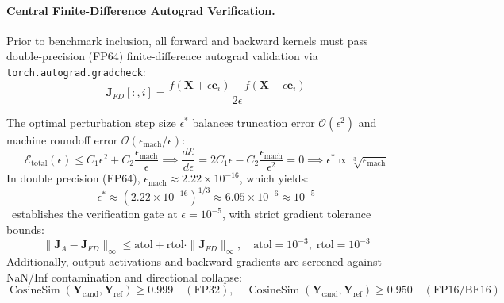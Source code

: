 \paragraph{Central Finite-Difference Autograd Verification.}
Prior to benchmark inclusion, all forward and backward kernels must pass double-precision (FP64) finite-difference autograd validation via \texttt{torch.autograd.gradcheck}:
\begin{equation}
\label{eq:finite_diff_eval}
\mathbf{J}_{FD}[:, i] = \frac{f(\mathbf{X} + \epsilon \mathbf{e}_i) - f(\mathbf{X} - \epsilon \mathbf{e}_i)}{2\epsilon}
\end{equation}

The optimal perturbation step size $\epsilon^*$ balances truncation error $\mathcal{O}(\epsilon^2)$ and machine roundoff error $\mathcal{O}(\epsilon_{\text{mach}} / \epsilon)$:
\begin{equation}
\label{eq:optimal_step_derivation}
\mathcal{E}_{\text{total}}(\epsilon) \le C_1 \epsilon^2 + C_2 \frac{\epsilon_{\text{mach}}}{\epsilon} \implies \frac{d\mathcal{E}}{d\epsilon} = 2 C_1 \epsilon - C_2 \frac{\epsilon_{\text{mach}}}{\epsilon^2} = 0 \implies \epsilon^* \propto \sqrt[3]{\epsilon_{\text{mach}}}
\end{equation}
In double precision (FP64), $\epsilon_{\text{mach}} \approx 2.22 \times 10^{-16}$, which yields:
\begin{equation}
\label{eq:eps_star_numeric}
\epsilon^* \approx \left(2.22 \times 10^{-16}\right)^{1/3} \approx 6.05 \times 10^{-6} \approx 10^{-5}
\end{equation}
\neuralops\ establishes the verification gate at $\epsilon = 10^{-5}$, with strict gradient tolerance bounds:
\begin{equation}
\label{eq:gradcheck_tolerances}
\|\mathbf{J}_A - \mathbf{J}_{FD}\|_\infty \le \text{atol} + \text{rtol} \cdot \|\mathbf{J}_{FD}\|_\infty, \quad \text{atol} = 10^{-3}, \; \text{rtol} = 10^{-3}
\end{equation}
Additionally, output activations and backward gradients are screened against NaN/Inf contamination and directional collapse:
\begin{equation}
\label{eq:sanity_check_formula}
\operatorname{CosineSim}(\mathbf{Y}_{\text{cand}}, \mathbf{Y}_{\text{ref}}) \ge 0.999 \quad (\text{FP32}), \quad \operatorname{CosineSim}(\mathbf{Y}_{\text{cand}}, \mathbf{Y}_{\text{ref}}) \ge 0.950 \quad (\text{FP16/BF16})
\end{equation}

